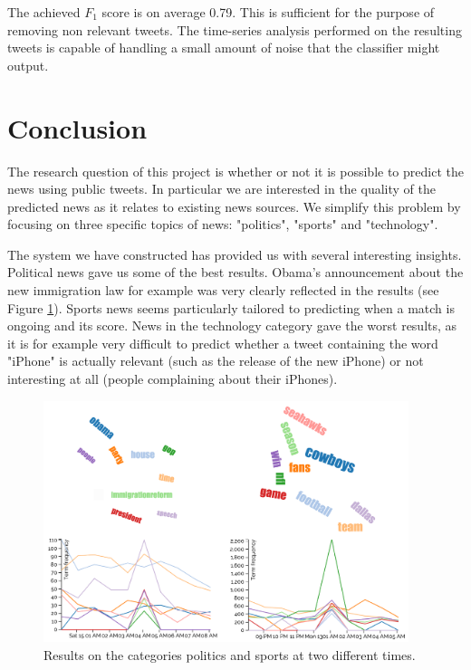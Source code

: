 \documentclass{llncs}
\begin{document}
The achieved $F_1$ score is on average 0.79. This is sufficient for the purpose of removing non relevant tweets. The time-series analysis performed on the resulting tweets is capable of handling a small amount of noise that the classifier might output.

\section{Conclusion}
The research question of this project is whether or not it is possible to predict the news using public tweets. In particular we are interested in the quality of the predicted news as it relates to existing news sources. We simplify this problem by focusing on three specific topics of news: "politics", "sports" and "technology".

The system we have constructed has provided us with several interesting insights. Political news gave us some of the best results. Obama's announcement about the new immigration law for example was very clearly reflected in the results (see Figure \ref{fig:results}). Sports news seems particularly tailored to predicting when a match is ongoing and its score. News in the technology category gave the worst results, as it is for example very difficult to predict whether a tweet containing the word "iPhone" is actually relevant (such as the release of the new iPhone) or not interesting at all (people complaining about their iPhones).

\begin{figure}
	\centering
	\includegraphics[width=0.95\textwidth]{images/results.png} 
	\caption{Results on the categories politics and sports at two different times.}
	\label{fig:results}
\end{figure}
\end{document}

